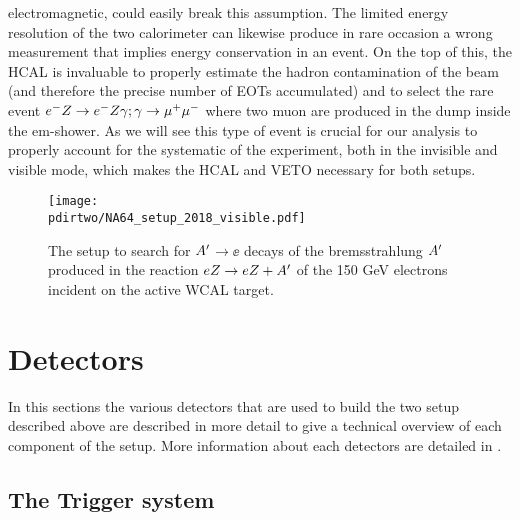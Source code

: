 electromagnetic, could easily break this assumption. The limited energy resolution of the two calorimeter can likewise produce in rare occasion a wrong measurement that implies energy conservation in an event. On the top of this, the HCAL is invaluable to properly estimate the hadron contamination of the beam (and therefore the precise number of EOTs accumulated) and to select the rare event $e^- Z \to e^- Z \gamma; \gamma \to \mu^+ \mu^-$ where two muon are produced in the dump inside the em-shower. As we will see this type of event is crucial for our analysis to properly account for the systematic of the experiment, both in the invisible and visible mode, which makes the HCAL and VETO necessary for both setups.

\iffalse
The method of the search for $\aee$ (or $\xdecay$) decays is detailed in . Here, we review it briefly. The $\DM$ is produced via scattering of 150 GeV electrons off nuclei of an active target-dump. The $\DM$ production is followed by its decay into $\ee$ pairs:
detailed in \cite{Gninenko:2013rka, Andreas:2013lya, gkkk1, DMsimulation}, 
\begin{equation}
e^- + Z \to e^- + Z + \DM   ;~ \DM\to \ee \,.
\label{ea}
\end{equation}
\fi

\begin{figure}[tb]
\centering
\texttt{[image: \\pdirtwo/NA64\_setup\_2018\_visible.pdf]}
\caption[NA64 visible mode setup 2018]{The setup to search for $\DM$$\to \ee$  decays of the bremsstrahlung $\DM$ produced in the reaction
$eZ \to eZ+A' $ of the 150 GeV electrons incident on the active WCAL target.}
\label{fig:setup-vis-2018}
\end{figure}

\section{Detectors}
\label{chapter2:sec:detectors}

In this sections the various detectors that are used to build the two setup described above are described in more detail to give a technical overview of each component of the setup. More information about each detectors are detailed in \cite{na64-hcal,na64-detectors,ABBON201569}. 

\subsection{The Trigger system}
\label{chapter2:sec:detectors-trigger}

